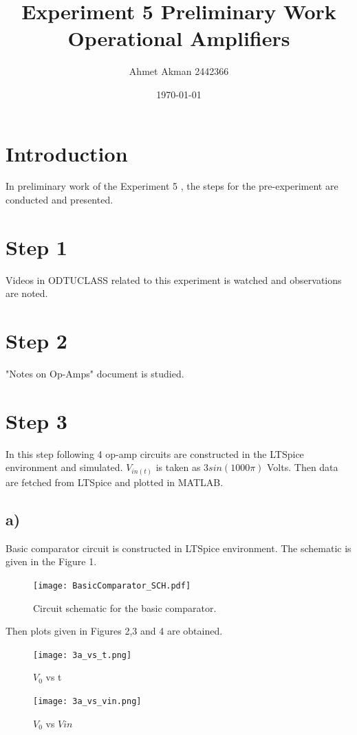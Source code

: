 \documentclass[letterpaper,12pt]{article}
\begin{document}
\title{Experiment 5 Preliminary Work \protect\\ Operational Amplifiers}
\author{Ahmet Akman 2442366 \protect\\}
\date{\today}
\maketitle


\section{Introduction} 
In preliminary work of the Experiment 5 , the steps for the pre-experiment are conducted and presented.
\section{Step 1}
Videos in  ODTUCLASS related to this experiment is watched and observations are noted.
\section{Step 2}
"Notes on Op-Amps" document is studied.
\section{Step 3}
In this step following 4 op-amp circuits are constructed in the LTSpice environment and simulated. \(V_{in (t)}\) is taken as \(3sin(1000\pi)\) Volts. Then data are fetched from LTSpice and plotted in MATLAB.
\subsection{a)}
Basic comparator circuit is constructed in LTSpice environment. The schematic is given in the Figure 1.
\begin{figure}[H]
	\centering
   \texttt{[image: BasicComparator\_SCH.pdf]}
   \caption{Circuit schematic for the basic comparator.}
\end{figure} 
Then plots given in Figures 2,3 and 4 are obtained.
\begin{figure}[H]
	\centering
   \texttt{[image: 3a\_vs\_t.png]}
   \caption{\(V_0\) vs t}
\end{figure}

\begin{figure}[H]
	\centering
   \texttt{[image: 3a\_vs\_vin.png]}
   \caption{\(V_0\) vs \(V{in}\)}
\end{figure}
\end{document}
